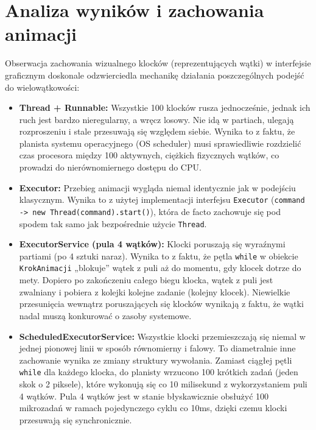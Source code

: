 \documentclass[11pt,a4paper]{article}
\begin{document}
\newpage\section{Analiza wyników i zachowania animacji}

Obserwacja zachowania wizualnego klocków (reprezentujących wątki) w interfejsie graficznym doskonale odzwierciedla mechanikę działania poszczególnych podejść do wielowątkowości:

\begin{itemize}
    \item \textbf{Thread + Runnable:} Wszystkie 100 klocków rusza jednocześnie, jednak ich ruch jest bardzo nieregularny, a wręcz losowy. Nie idą w partiach, ulegają rozproszeniu i stale przesuwają się względem siebie. Wynika to z faktu, że planista systemu operacyjnego (OS scheduler) musi sprawiedliwie rozdzielić czas procesora między 100 aktywnych, ciężkich fizycznych wątków, co prowadzi do nierównomiernego dostępu do CPU.
    
    \item \textbf{Executor:} Przebieg animacji wygląda niemal identycznie jak w podejściu klasycznym. Wynika to z użytej implementacji interfejsu \texttt{Executor} (\texttt{command -> new Thread(command).start()}), która de facto zachowuje się pod spodem tak samo jak bezpośrednie użycie \texttt{Thread}.
    
    \item \textbf{ExecutorService (pula 4 wątków):} Klocki poruszają się wyraźnymi partiami (po 4 sztuki naraz). Wynika to z faktu, że pętla \texttt{while} w obiekcie \texttt{KrokAnimacji} „blokuje” wątek z puli aż do momentu, gdy klocek dotrze do mety. Dopiero po zakończeniu całego biegu klocka, wątek z puli jest zwalniany i pobiera z kolejki kolejne zadanie (kolejny klocek). Niewielkie przesunięcia wewnątrz poruszających się klocków wynikają z faktu, że wątki nadal muszą konkurować o zasoby systemowe.
    
    \item \textbf{ScheduledExecutorService:} Wszystkie klocki przemieszczają się niemal w jednej pionowej linii w sposób równomierny i falowy. To diametralnie inne zachowanie wynika ze zmiany struktury wywołania. Zamiast ciągłej pętli \texttt{while} dla każdego klocka, do planisty wrzucono 100 krótkich zadań (jeden skok o 2 piksele), które wykonują się co 10 milisekund z wykorzystaniem puli 4 wątków. Pula 4 wątków jest w stanie błyskawicznie obsłużyć 100 mikrozadań w ramach pojedynczego cyklu co 10ms, dzięki czemu klocki przesuwają się synchronicznie.
\end{itemize}
\end{document}
